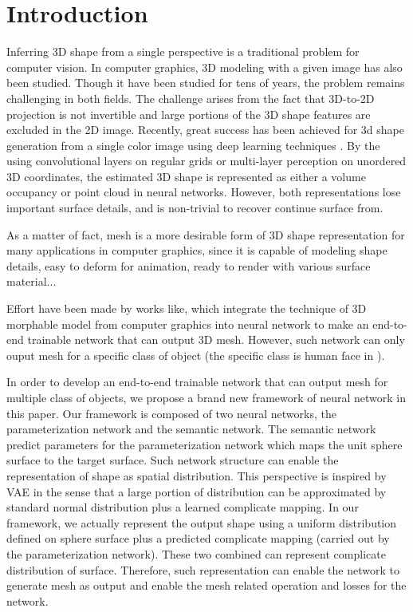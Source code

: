  \section{Introduction}
Inferring 3D shape from a single perspective is a traditional problem for computer vision.  In computer graphics, 3D modeling with a given image has also been studied. Though it have been studied for tens of years, the problem remains challenging in both fields. The challenge arises from the fact that 3D-to-2D projection is not invertible and large portions of the 3D shape features are excluded in the 2D image. Recently, great success has been achieved for 3d shape generation from a single color image using deep learning techniques
\cite{3DR2N2,PSGN}. By the using convolutional layers on regular grids or multi-layer
perception on unordered 3D coordinates, the estimated 3D shape is represented
as either a volume occupancy \cite{3DR2N2} or point cloud \cite{PSGN} in neural networks. However, both representations lose important
surface details, and is non-trivial to recover continue surface from.

As a matter of fact, mesh is a more desirable form of 3D shape representation for many applications in computer graphics, since it is capable of
modeling shape details, easy to deform for animation, ready to render with various surface material...


Effort have been made by works like\cite{endface}, which integrate the technique of 3D morphable model from computer graphics into neural network to make an end-to-end trainable network that can output 3D mesh. However, such network can only ouput mesh for a specific class of object (the specific class is human face in \cite{endface}).

In order to develop an end-to-end trainable network that can output mesh for multiple class of objects, we propose a brand new framework of neural network in this paper. Our framework is composed of two neural networks, the parameterization network and the semantic network.  The semantic network predict parameters for the parameterization network which maps the unit sphere surface to the target surface. Such network structure can enable the representation of shape as spatial distribution. This perspective is inspired by VAE\cite{VAE} in the sense that a large portion of distribution can be approximated by standard normal distribution plus a learned complicate mapping. In our framework, we actually represent the output shape using a uniform distribution defined on sphere surface plus a predicted complicate mapping (carried out by the parameterization network). These two combined can represent complicate distribution of surface. Therefore, such representation can enable the network to generate mesh as output and enable the mesh related operation and losses for the network.

